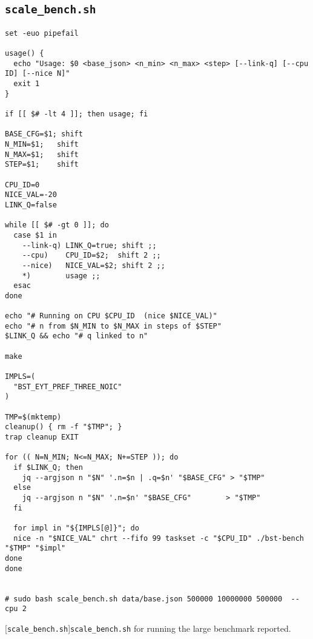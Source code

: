 \subsection{\texttt{scale\_bench.sh}}
\label{secsec:scale}
\begin{lstlisting}
set -euo pipefail

usage() {
  echo "Usage: $0 <base_json> <n_min> <n_max> <step> [--link-q] [--cpu ID] [--nice N]"
  exit 1
}

if [[ $# -lt 4 ]]; then usage; fi

BASE_CFG=$1; shift
N_MIN=$1;   shift
N_MAX=$1;   shift
STEP=$1;    shift

CPU_ID=0          
NICE_VAL=-20      
LINK_Q=false

while [[ $# -gt 0 ]]; do
  case $1 in
    --link-q) LINK_Q=true; shift ;;
    --cpu)    CPU_ID=$2;  shift 2 ;;
    --nice)   NICE_VAL=$2; shift 2 ;;
    *)        usage ;;
  esac
done

echo "# Running on CPU $CPU_ID  (nice $NICE_VAL)"
echo "# n from $N_MIN to $N_MAX in steps of $STEP"
$LINK_Q && echo "# q linked to n"

make

IMPLS=(
  "BST_EYT_PREF_THREE_NOIC"
)

TMP=$(mktemp)
cleanup() { rm -f "$TMP"; }
trap cleanup EXIT

for (( N=N_MIN; N<=N_MAX; N+=STEP )); do
  if $LINK_Q; then
    jq --argjson n "$N" '.n=$n | .q=$n' "$BASE_CFG" > "$TMP"
  else
    jq --argjson n "$N" '.n=$n' "$BASE_CFG"        > "$TMP"
  fi

  for impl in "${IMPLS[@]}"; do
  nice -n "$NICE_VAL" chrt --fifo 99 taskset -c "$CPU_ID" ./bst-bench "$TMP" "$impl"
done
done


# sudo bash scale_bench.sh data/base.json 500000 10000000 500000  --cpu 2 
\end{lstlisting}
[\texttt{scale\_bench.sh}]{\texttt{scale\_bench.sh} for running the large benchmark reported.}
\label{lst:scale}